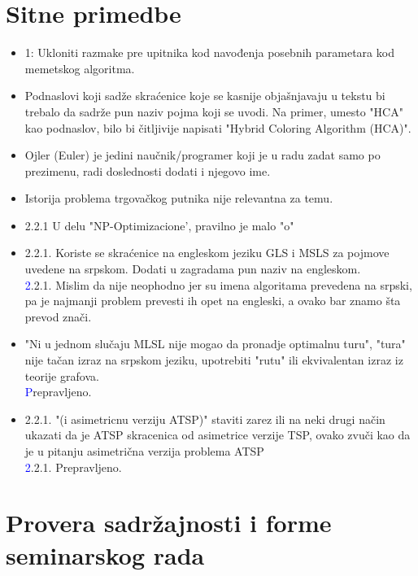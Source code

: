 \documentclass[a4paper]{report}
\newcommand{\odgovor}[1]{\textcolor{blue}{#1}}
\begin{document}
\section{Sitne primedbe}
\begin{itemize}
    \item 1: Ukloniti razmake pre upitnika kod navođenja posebnih parametara kod memetskog algoritma.
    \item Podnaslovi koji sadže skraćenice koje se kasnije objašnjavaju u tekstu bi trebalo da sadrže pun naziv pojma koji se uvodi. Na primer, umesto "HCA" kao podnaslov, bilo bi čitljivije napisati "Hybrid Coloring Algorithm (HCA)".
    \item Ojler (Euler) je jedini naučnik/programer koji je u radu zadat samo po prezimenu, radi doslednosti dodati i njegovo ime.
    \item Istorija problema trgovačkog putnika nije relevantna za temu.
    \item 2.2.1 U delu "NP-Optimizacione', pravilno je malo "o"
    \item 2.2.1. Koriste se skraćenice na engleskom jeziku GLS i MSLS za pojmove uvedene na srpskom. Dodati u zagradama pun naziv na engleskom. \\
    \odgovor 2.2.1. Mislim da nije neophodno jer su imena algoritama prevedena na srpski, pa je najmanji problem prevesti ih opet na engleski, a ovako bar znamo šta prevod znači. 
    
    \item "Ni u jednom slučaju MLSL nije mogao da pronadje optimalnu turu", "tura" nije tačan izraz na srpskom jeziku, upotrebiti "rutu" ili ekvivalentan izraz iz teorije grafova.\\
    \odgovor Prepravljeno.
    
    \item 2.2.1. "(i asimetricnu verziju ATSP)" staviti zarez ili na neki drugi način ukazati da je ATSP skracenica od asimetrice verzije TSP, ovako zvuči kao da je u pitanju asimetrična verzija problema ATSP \\
 \odgovor 2.2.1.  Prepravljeno. \\
    
   
\end{itemize}



\section{Provera sadržajnosti i forme seminarskog rada}
\end{document}
